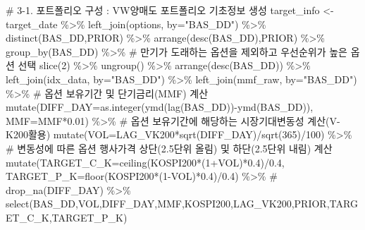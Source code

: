 \documentclass[
  a4paper,
  DIV=11,
  numbers=noendperiod]{scrreprt}
\newenvironment{Shaded}{\begin{snugshade}}{\end{snugshade}}
\newcommand{\AttributeTok}[1]{\textcolor[rgb]{0.40,0.45,0.13}{#1}}
\newcommand{\CommentTok}[1]{\textcolor[rgb]{0.37,0.37,0.37}{#1}}
\newcommand{\DecValTok}[1]{\textcolor[rgb]{0.68,0.00,0.00}{#1}}
\newcommand{\FloatTok}[1]{\textcolor[rgb]{0.68,0.00,0.00}{#1}}
\newcommand{\FunctionTok}[1]{\textcolor[rgb]{0.28,0.35,0.67}{#1}}
\newcommand{\NormalTok}[1]{\textcolor[rgb]{0.00,0.23,0.31}{#1}}
\newcommand{\OtherTok}[1]{\textcolor[rgb]{0.00,0.23,0.31}{#1}}
\newcommand{\SpecialCharTok}[1]{\textcolor[rgb]{0.37,0.37,0.37}{#1}}
\newcommand{\StringTok}[1]{\textcolor[rgb]{0.13,0.47,0.30}{#1}}
\begin{document}
\begin{Shaded}
\begin{Highlighting}[]
\CommentTok{\# 3{-}1. 포트폴리오 구성 : VW양매도 포트폴리오 기초정보 생성}
\NormalTok{target\_info }\OtherTok{\textless{}{-}}\NormalTok{ target\_date }\SpecialCharTok{\%\textgreater{}\%} 
  \FunctionTok{left\_join}\NormalTok{(options, }\AttributeTok{by=}\StringTok{"BAS\_DD"}\NormalTok{) }\SpecialCharTok{\%\textgreater{}\%} 
  \FunctionTok{distinct}\NormalTok{(BAS\_DD,PRIOR) }\SpecialCharTok{\%\textgreater{}\%} 
  \FunctionTok{arrange}\NormalTok{(}\FunctionTok{desc}\NormalTok{(BAS\_DD),PRIOR) }\SpecialCharTok{\%\textgreater{}\%} 
  \FunctionTok{group\_by}\NormalTok{(BAS\_DD) }\SpecialCharTok{\%\textgreater{}\%} 
  \CommentTok{\# 만기가 도래하는 옵션을 제외하고 우선순위가 높은 옵션 선택}
  \FunctionTok{slice}\NormalTok{(}\DecValTok{2}\NormalTok{) }\SpecialCharTok{\%\textgreater{}\%} 
  \FunctionTok{ungroup}\NormalTok{() }\SpecialCharTok{\%\textgreater{}\%} 
  \FunctionTok{arrange}\NormalTok{(}\FunctionTok{desc}\NormalTok{(BAS\_DD)) }\SpecialCharTok{\%\textgreater{}\%} 
  \FunctionTok{left\_join}\NormalTok{(idx\_data, }\AttributeTok{by=}\StringTok{"BAS\_DD"}\NormalTok{) }\SpecialCharTok{\%\textgreater{}\%} 
  \FunctionTok{left\_join}\NormalTok{(mmf\_raw, }\AttributeTok{by=}\StringTok{"BAS\_DD"}\NormalTok{) }\SpecialCharTok{\%\textgreater{}\%} 
  \CommentTok{\# 옵션 보유기간 및 단기금리(MMF) 계산}
  \FunctionTok{mutate}\NormalTok{(}\AttributeTok{DIFF\_DAY=}\FunctionTok{as.integer}\NormalTok{(}\FunctionTok{ymd}\NormalTok{(}\FunctionTok{lag}\NormalTok{(BAS\_DD))}\SpecialCharTok{{-}}\FunctionTok{ymd}\NormalTok{(BAS\_DD)),}
         \AttributeTok{MMF=}\NormalTok{MMF}\SpecialCharTok{*}\FloatTok{0.01}\NormalTok{) }\SpecialCharTok{\%\textgreater{}\%} 
  \CommentTok{\# 옵션 보유기간에 해당하는 시장기대변동성 계산(V{-}K200활용)}
  \FunctionTok{mutate}\NormalTok{(}\AttributeTok{VOL=}\NormalTok{LAG\_VK200}\SpecialCharTok{*}\FunctionTok{sqrt}\NormalTok{(DIFF\_DAY)}\SpecialCharTok{/}\FunctionTok{sqrt}\NormalTok{(}\DecValTok{365}\NormalTok{)}\SpecialCharTok{/}\DecValTok{100}\NormalTok{) }\SpecialCharTok{\%\textgreater{}\%}
  \CommentTok{\# 변동성에 따른 옵션 행사가격 상단(2.5단위 올림) 및 하단(2.5단위 내림) 계산}
  \FunctionTok{mutate}\NormalTok{(}\AttributeTok{TARGET\_C\_K=}\FunctionTok{ceiling}\NormalTok{(KOSPI200}\SpecialCharTok{*}\NormalTok{(}\DecValTok{1}\SpecialCharTok{+}\NormalTok{VOL)}\SpecialCharTok{*}\FloatTok{0.4}\NormalTok{)}\SpecialCharTok{/}\FloatTok{0.4}\NormalTok{,}
         \AttributeTok{TARGET\_P\_K=}\FunctionTok{floor}\NormalTok{(KOSPI200}\SpecialCharTok{*}\NormalTok{(}\DecValTok{1}\SpecialCharTok{{-}}\NormalTok{VOL)}\SpecialCharTok{*}\FloatTok{0.4}\NormalTok{)}\SpecialCharTok{/}\FloatTok{0.4}\NormalTok{) }\SpecialCharTok{\%\textgreater{}\%} 
  \CommentTok{\# drop\_na(DIFF\_DAY) \%\textgreater{}\% }
  \FunctionTok{select}\NormalTok{(BAS\_DD,VOL,DIFF\_DAY,MMF,KOSPI200,LAG\_VK200,PRIOR,TARGET\_C\_K,TARGET\_P\_K)}


\end{Highlighting}
\end{Shaded}
\end{document}
